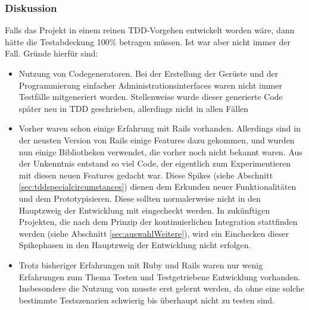 \subsubsection*{Diskussion}
Falls das Projekt in einem reinen TDD-Vorgehen entwickelt worden wäre, dann hätte die Testabdeckung 100\% betragen müssen. Ist war aber nicht immer der Fall. Gründe hierfür sind:
\begin{itemize}
 \item Nutzung von Codegeneratoren. Bei der Erstellung der Gerüste und der Programmierung einfacher Administrationsinterfaces waren nicht immer Testfälle mitgeneriert worden. Stellenweise wurde dieser generierte Code später neu in TDD geschrieben, allerdings nicht in allen Fällen
 \item Vorher waren schon einige Erfahrung mit Rails vorhanden. Allerdings sind in der neusten Version von Rails einige Features dazu gekommen, und wurden nun einige Bibliotheken verwendet, die vorher noch nicht bekannt waren. Aus der Unkenntnis entstand so viel Code, der eigentlich zum Experimentieren mit diesen neuen Features gedacht war. Diese Spikes (siehe Abschnitt \ref{sec:tddspecialcircumstances}) dienen dem Erkunden neuer Funktionalitäten und dem Prototypisieren. Diese sollten normalerweise nicht in den Hauptzweig der Entwicklung mit eingecheckt werden. In zukünftigen Projekten, die nach dem Prinzip der kontinuierlichen Integration stattfinden werden (siehe Abschnitt \ref{sec:auswahlWeitere}), wird ein Einchecken dieser Spikephasen in den Hauptzweig der Entwicklung nicht erfolgen.
 \item Trotz bisheriger Erfahrungen mit Ruby und Rails waren nur wenig Erfahrungen zum Thema Testen und Testgetriebene Entwicklung vorhanden. Insbesondere die Nutzung von  musste erst gelernt werden, da ohne eine solche bestimmte Testszenarien schwierig bis überhaupt nicht zu testen sind.
 
\end{itemize}

